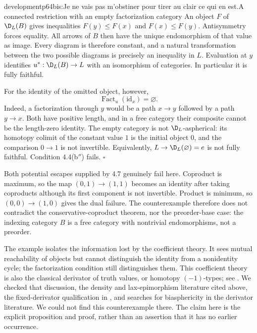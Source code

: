 \begin{dcomment}{development}{p64bis:Je ne vais pas m'obstiner pour tirer au clair ce qui en est.}{A connected restriction with an empty factorization category}
An object $F$ of $\D_L(B)$ gives inequalities $F(y)\leq F(x)$ and $F(x)\leq F(y)$. Antisymmetry forces equality. All arrows of $B$ then have the unique endomorphism of that value as image. Every diagram is therefore constant, and a natural transformation between the two possible diagrams is precisely an inequality in $L$. Evaluation at $y$ identifies $u^*:\D_L(B)\to L$ with an isomorphism of categories. In particular it is fully faithful.

For the identity of the omitted object, however,
\[
        \operatorname{Fact}_u(\mathrm{id}_x)=\varnothing.
\]
Indeed, a factorization through $y$ would be a path $x\to y$ followed by a path $y\to x$. Both have positive length, and in a free category their composite cannot be the length-zero identity. The empty category is not $\D_L$-aspherical: its homotopy colimit of the constant value $1$ is the initial object $0$, and the comparison $0\to1$ is not invertible. Equivalently, $L\to\D_L(\varnothing)=e$ is not fully faithful. Condition 4.4(b$''$) fails. \hfill$\square$

Both potential escapes supplied by 4.7 genuinely fail here. Coproduct is maximum, so the map $(0,1)\to(1,1)$ becomes an identity after taking coproducts although its first component is not invertible. Product is minimum, so $(0,0)\to(1,0)$ gives the dual failure. The counterexample therefore does not contradict the conservative-coproduct theorem, nor the preorder-base case: the indexing category $B$ is a free category with nontrivial endomorphisms, not a preorder.

The example isolates the information lost by the coefficient theory. It sees mutual reachability of objects but cannot distinguish the identity from a nonidentity cycle; the factorization condition still distinguishes them. This coefficient theory is also the classical derivator of truth values, or homotopy $(-1)$-types; see \citet[p.~33]{Shulman2023Setoids}. We checked that discussion, the density and lax-epimorphism literature cited above, the fixed-derivator qualification in \citet[Remark 6.3(ii)]{GrothStovicek2016Trees}, and searches for biasphericity in the derivator literature. We could not find this counterexample there. The claim here is the explicit proposition and proof, rather than an assertion that it has no earlier occurrence.
\end{dcomment}

